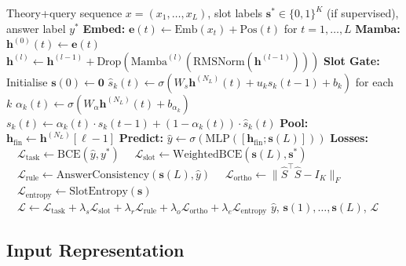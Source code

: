 \documentclass[conference]{IEEEtran}
\DeclareRobustCommand{\model}{NeSy-Mamba}
\begin{document}
\begin{algorithm}[t]
\caption{\model{} Forward Pass and Loss Computation}
\label{alg:forward}
\begin{algorithmic}[1]
\REQUIRE Theory+query sequence $x = (x_1, \ldots, x_L)$,
  slot labels $\mathbf{s}^* \in \{0,1\}^K$ (if supervised),
  answer label $y^*$
\STATE \textbf{Embed:} $\mathbf{e}(t) \leftarrow \mathrm{Emb}(x_t) + \mathrm{Pos}(t)$
        for $t = 1, \ldots, L$
\STATE \textbf{Mamba:} $\mathbf{h}^{(0)}(t) \leftarrow \mathbf{e}(t)$
    \STATE $\mathbf{h}^{(l)} \!\leftarrow\! \mathbf{h}^{(l-1)} \!+\!
        \mathrm{Drop}(\mathrm{Mamba}^{(l)}(\mathrm{RMSNorm}(\mathbf{h}^{(l-1)})))$
\ENDFOR
\STATE \textbf{Slot Gate:} Initialise $\mathbf{s}(0) \leftarrow \mathbf{0}$
    \STATE $\hat{s}_k(t) \leftarrow \sigma(W_s \mathbf{h}^{(N_L)}(t) + u_k s_k(t{-}1) + b_k)$ for each $k$
    \STATE $\alpha_k(t) \leftarrow \sigma(W_\alpha \mathbf{h}^{(N_L)}(t) + b_{\alpha_k})$
    \STATE $s_k(t) \leftarrow \alpha_k(t) \cdot s_k(t{-}1) + (1-\alpha_k(t)) \cdot \hat{s}_k(t)$
\ENDFOR
\STATE \textbf{Pool:} $\mathbf{h}_{\mathrm{fin}} \leftarrow \mathbf{h}^{(N_L)}[\ell-1]$ 
\STATE \textbf{Predict:} $\hat{y} \leftarrow \sigma(\mathrm{MLP}([\mathbf{h}_{\mathrm{fin}}; \mathbf{s}(L)]))$
\STATE \textbf{Losses:}
\STATE $\quad \mathcal{L}_{\text{task}} \leftarrow \mathrm{BCE}(\hat{y}, y^*)$
\STATE $\quad \mathcal{L}_{\text{slot}} \leftarrow \text{WeightedBCE}(\mathbf{s}(L), \mathbf{s}^*)$
\STATE $\quad \mathcal{L}_{\text{rule}} \leftarrow \text{AnswerConsistency}(\mathbf{s}(L), \hat{y})$
\STATE $\quad \mathcal{L}_{\text{ortho}} \leftarrow \|{\hat{S}^\top \hat{S} - I_K}\|_F$
\STATE $\quad \mathcal{L}_{\text{entropy}} \leftarrow \text{SlotEntropy}(\mathbf{s})$
\STATE $\quad \mathcal{L} \leftarrow \mathcal{L}_{\text{task}} + \lambda_s \mathcal{L}_{\text{slot}} + \lambda_r \mathcal{L}_{\text{rule}} + \lambda_o \mathcal{L}_{\text{ortho}} + \lambda_e \mathcal{L}_{\text{entropy}}$
\RETURN $\hat{y}$, $\mathbf{s}(1), \ldots, \mathbf{s}(L)$, $\mathcal{L}$
\end{algorithmic}
\end{algorithm}

\subsection{Input Representation}
\label{sec:input}
\end{document}
